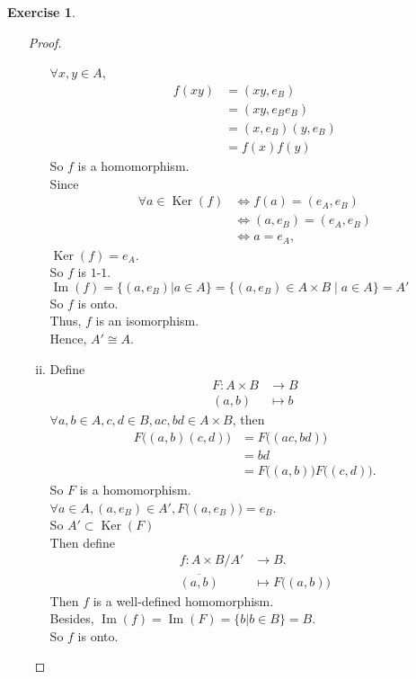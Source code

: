 \documentclass{amsart}
\renewcommand{\ker}{\operatorname{Ker}}
\newcommand{\im}{\operatorname{Im}}
\theoremstyle{plain}
\theoremstyle{definition}
\newtheorem{exer}[lem]{Exercise}
\begin{document}
\begin{exer}
\begin{enumerate}[(a)]
\begin{proof}
\begin{enumerate}[(i)]
				$\forall x, y \in A$, 
			\begin{align*}
				f(xy) &= (xy, e_B) \\
				  	  &= (xy,e_Be_B) \\
				  	  &= (x,e_B)(y,e_B) \\
				  	  &= f(x)f(y)
			\end{align*}
			So $f$ is a homomorphism.\\
			Since
				\begin{align*}
					\forall a \in \ker(f) & \Longleftrightarrow f(a) = (e_A,e_B)\\
										  & \Longleftrightarrow (a, e_B) = (e_A,e_B) \\			
										  & \Longleftrightarrow a = e_A,			
				\end{align*}
			$\ker(f) = e_A$.\\
			So $f$ is $1$-$1$.\\
			$\im(f) = \{(a,e_B)| a\in A\} = \{(a,e_B)\in A\times B\mid a\in A\} = A' $ \\ 
			So $f$ is onto.\\
			Thus, $f$ is an isomorphism.\\
			Hence, $A'\cong A$.
		\item 
			Define
				\begin{align*}
					F:  A \times B &\to B\\
							 (a,b) &\mapsto b
				\end{align*}
				$\forall a,b\in A, c,d \in B, ac,bd \in A\times B $, then   
			\begin{align*}
				F\big((a,b)(c,d)\big) &= F\big((ac,bd)\big) \\ 
									  &= bd \\
									  &= F\big((a,b)\big)F\big((c,d)\big).
			\end{align*}
			So $F$ is a homomorphism.\\
			$\forall a \in A, (a,e_B) \in A', F\big((a,e_B)\big) = e_B$.\\
			So $A' \subset \ker(F)$ \\
			Then define
			\begin{align*}
				f: A\times B / A' & \to B. \\
				\overline{(a,b)} & \mapsto F\big((a,b)\big)
			\end{align*}
			Then $f$ is a well-defined homomorphism.\\
			Besides, $\im(f) = \im(F) = \{b | b\in B\} = B$.\\
			So $f$ is onto. \\

\end{enumerate}
\end{proof}
\end{enumerate}
\end{exer}
\end{document}
